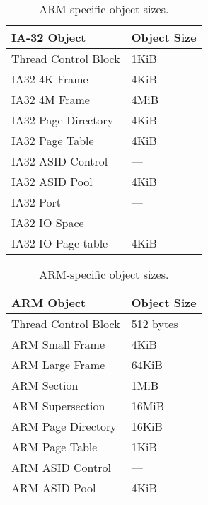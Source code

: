 {\begin{table}[htbp]
\ifxeightsix
    \parbox{.45\linewidth}{
        \begin{center}
            \begin{tabular}{ l l }
                \toprule
                IA-32 Object              & Object Size \\
                \midrule
                Thread Control Block      & 1KiB \\
                IA32 4K Frame             & 4KiB \\
                IA32 4M Frame             & 4MiB \\
                IA32 Page Directory       & 4KiB \\
                IA32 Page Table           & 4KiB \\
                IA32 ASID Control         & --- \\
                IA32 ASID Pool            & 4KiB \\
                IA32 Port                 & --- \\
                IA32 IO Space             & --- \\
                IA32 IO Page table        & 4KiB \\
                \bottomrule
            \end{tabular}
        \end{center}
    \caption{IA-32-specific object sizes.}
    \label{tab:intel_obj_sizes}
    }
\hfill
\fi
    \parbox{.45\linewidth}{
        \begin{center}
            \begin{tabular}{ l l }
                \toprule
                ARM Object              & Object Size \\
                \midrule
                Thread Control Block    & 512 bytes \\
                ARM Small Frame         & 4KiB \\
                ARM Large Frame         & 64KiB \\
                ARM Section             & 1MiB \\
                ARM Supersection        & 16MiB \\
                ARM Page Directory      & 16KiB \\
                ARM Page Table          & 1KiB \\
                ARM ASID Control        & --- \\
                ARM ASID Pool           & 4KiB \\
                \bottomrule
            \end{tabular}
        \end{center}
    \caption{ARM-specific object sizes.}
    \label{tab:arm_obj_sizes}
    }
\end{table}
}
\label{sec:api-untyped-retype}
